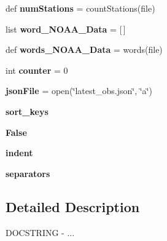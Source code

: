 \begin{DoxyCompactItemize}
\mbox{\label{namespacescrape___n_o_a_a__buoy_a30858790a57da253c204891135cfed35}} 
def {\bfseries num\+Stations} = count\+Stations(file)
\item 
\mbox{\label{namespacescrape___n_o_a_a__buoy_aa1419d157780d68fd320aa068022fe2c}} 
list {\bfseries word\+\_\+\+N\+O\+A\+A\+\_\+\+Data} = \mbox{[}$\,$\mbox{]}
\item 
\mbox{\label{namespacescrape___n_o_a_a__buoy_af236cd277a9ee5dbc44061ad0aee6436}} 
def {\bfseries words\+\_\+\+N\+O\+A\+A\+\_\+\+Data} = words(file)
\item 
\mbox{\label{namespacescrape___n_o_a_a__buoy_ac431707bdcfc97de5c4e55620f3edc22}} 
int {\bfseries counter} = 0
\item 
\mbox{\label{namespacescrape___n_o_a_a__buoy_acfb5a9032b48342e66c387977e98d0f9}} 
{\bfseries json\+File} = open(\char`\"{}latest\+\_\+obs.\+json\char`\"{}, \char`\"{}a\char`\"{})
\item 
\mbox{\label{namespacescrape___n_o_a_a__buoy_afd38d2dcc28ce29bd902515fd4f90fb4}} 
{\bfseries sort\+\_\+keys}
\item 
\mbox{\label{namespacescrape___n_o_a_a__buoy_a4c71c7b66fe80449f261f77161497df4}} 
{\bfseries False}
\item 
\mbox{\label{namespacescrape___n_o_a_a__buoy_a6eca3040dae84a81c50769d2c116e69f}} 
{\bfseries indent}
\item 
\mbox{\label{namespacescrape___n_o_a_a__buoy_a9bb62d822eeb576e4f5ac831d5cc117b}} 
{\bfseries separators}
\end{DoxyCompactItemize}


\subsection{Detailed Description}
\begin{DoxyVerb}DOCSTRING - ...
\end{DoxyVerb}
 